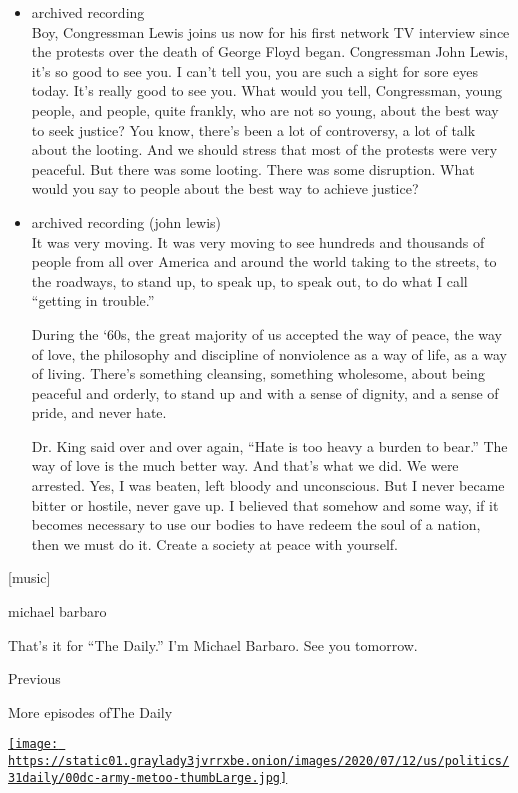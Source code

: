 \begin{itemize}
\item
  archived recording\\
  Boy, Congressman Lewis joins us now for his first network TV interview
  since the protests over the death of George Floyd began. Congressman
  John Lewis, it's so good to see you. I can't tell you, you are such a
  sight for sore eyes today. It's really good to see you. What would you
  tell, Congressman, young people, and people, quite frankly, who are
  not so young, about the best way to seek justice? You know, there's
  been a lot of controversy, a lot of talk about the looting. And we
  should stress that most of the protests were very peaceful. But there
  was some looting. There was some disruption. What would you say to
  people about the best way to achieve justice?
\item
  archived recording (john lewis)\\
  It was very moving. It was very moving to see hundreds and thousands
  of people from all over America and around the world taking to the
  streets, to the roadways, to stand up, to speak up, to speak out, to
  do what I call ``getting in trouble.''

  During the `60s, the great majority of us accepted the way of peace,
  the way of love, the philosophy and discipline of nonviolence as a way
  of life, as a way of living. There's something cleansing, something
  wholesome, about being peaceful and orderly, to stand up and with a
  sense of dignity, and a sense of pride, and never hate.

  Dr. King said over and over again, ``Hate is too heavy a burden to
  bear.'' The way of love is the much better way. And that's what we
  did. We were arrested. Yes, I was beaten, left bloody and unconscious.
  But I never became bitter or hostile, never gave up. I believed that
  somehow and some way, if it becomes necessary to use our bodies to
  have redeem the soul of a nation, then we must do it. Create a society
  at peace with yourself.
\end{itemize}

{[}music{]}

michael barbaro

That's it for ``The Daily.'' I'm Michael Barbaro. See you tomorrow.

Previous

More episodes ofThe Daily

\href{https://www.nytimes3xbfgragh.onion/2020/07/31/podcasts/the-daily/vanessa-guillen-military-metoo.html?action=click\&module=audio-series-bar\&region=header\&pgtype=Article}{\texttt{[image: https://static01.graylady3jvrrxbe.onion/images/2020/07/12/us/politics/31daily/00dc-army-metoo-thumbLarge.jpg]}}

